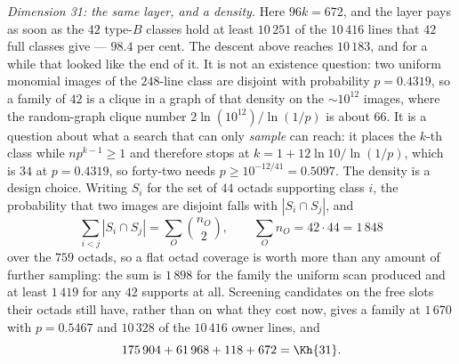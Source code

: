 \documentclass[11pt]{amsart}
\theoremstyle{remark}
\begin{document}
\emph{Dimension 31: the same layer, and a density.} Here $96k=672$, and the
layer pays as soon as the $42$ type-$B$ classes hold at least $10\,251$ of the
$10\,416$ lines that $42$ full classes give --- $98.4$ per cent. The descent
above reaches $10\,183$, and for a while that looked like the end of it. It is
not an existence question: two uniform monomial images of the $248$-line class
are disjoint with probability $p=0.4319$, so a family of $42$ is a clique in a
graph of that density on the $\sim\!10^{12}$ images, where the random-graph
clique number $2\ln(10^{12})/\ln(1/p)$ is about $66$. It is a question about
what a search that can only \emph{sample} can reach: it places the $k$-th class
while $np^{k-1}\ge1$ and therefore stops at $k=1+12\ln10/\ln(1/p)$, which is
$34$ at $p=0.4319$, so forty-two needs $p\ge10^{-12/41}=0.5097$. The density is
a design choice. Writing $S_{i}$ for the set of $44$ octads supporting class
$i$, the probability that two images are disjoint falls with $|S_{i}\cap S_{j}|$,
and
\[
  \sum_{i<j}|S_{i}\cap S_{j}|=\sum_{O}\binom{n_{O}}{2},\qquad
  \sum_{O}n_{O}=42\cdot44=1\,848
\]
over the $759$ octads, so a flat octad coverage is worth more than any amount of
further sampling: the sum is $1\,898$ for the family the uniform scan produced
and at least $1\,419$ for any $42$ supports at all. Screening candidates on the
free slots their octads still have, rather than on what they cost now, gives a
family at $1\,670$ with $p=0.5467$ and $10\,328$ of the $10\,416$ owner lines,
and
\[
  175\,904+61\,968+118+672=\Kh{31} .
\]
\end{document}
